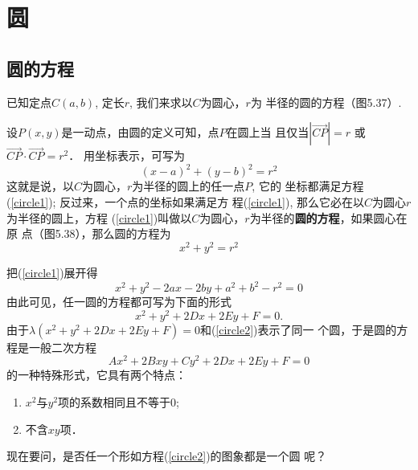 \section{圆}
\subsection{圆的方程}
已知定点$C(a,b)$, 定长$r$, 我们来求以$C$为圆心，$r$为
半径的圆的方程（图5.37）.

设$P(x,y)$是一动点，由圆的定义可知，点$P$在圆上当
且仅当$|\Vec{CP}|=r$
或$\Vec{CP}\cdot \Vec{CP}=r^2$．
用坐标表示，可写为
\begin{equation}\label{circle1}
(x-a)^2+(y-b)^2=r^2
\end{equation}
这就是说，以$C$为圆心，$r$为半径的圆上的任一点$P$, 它的
坐标都满足方程(\ref{circle1}); 反过来，一个点的坐标如果满足方
程(\ref{circle1}), 那么它必在以$C$为圆心$r$为半径的圆上，方程
(\ref{circle1})叫做以$C$为圆心，$r$为半径的\textbf{圆的方程}，如果圆心在原
点（图5.38），那么圆的方程为
\begin{equation}
    x^2+y^2=r^2
\end{equation}

\begin{figure}[htp]\centering
    \begin{minipage}[t]{0.48\textwidth}
    \centering
    \caption{}
    \end{minipage}
    \begin{minipage}[t]{0.48\textwidth}
    \centering
    \caption{}
    \end{minipage}
    \end{figure}


把(\ref{circle1})展开得
\[x^2+y^2-2ax-2by+a^2+b^2-r^2=0\]
由此可见，任一圆的方程都可写为下面的形式
\begin{equation}\label{circle2}
    x^2+y^2+2Dx+2Ey+F=0.
\end{equation}
由于$\lambda(x^2+y^2+2Dx+2Ey+F)=0$和(\ref{circle2})表示了同一
个圆，于是圆的方程是一般二次方程
\[Ax^2+2Bxy+Cy^2+2Dx+2Ey+F=0\]
的一种特殊形式，它具有两个特点：
\begin{enumerate}
    \item $x^2$与$y^2$项的系数相同且不等于0;
    \item 不含$xy$项．
\end{enumerate}
现在要问，是否任一个形如方程(\ref{circle2})的图象都是一个圆
呢？

